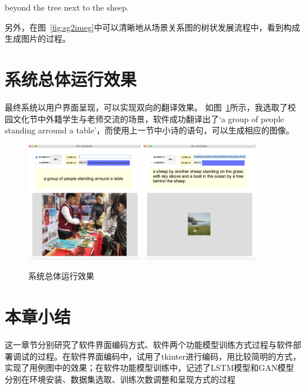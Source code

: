 beyond the tree next to the sheep.

另外，在图~\ref{fig:sg2imeg}中可以清晰地从场景关系图的树状发展流程中，看到构成生成图片的过程。

\section{系统总体运行效果}
最终系统以用户界面呈现，可以实现双向的翻译效果。
如图~\ref{fig:eff}所示，我选取了校园文化节中外籍学生与老师交流的场景，软件成功翻译出了‘a group of people standing arround a table’，而使用上一节中小诗的语句，可以生成相应的图像。

\begin{figure}[!htbp]
    \centering
        \includegraphics[width=0.45\textwidth]{figures/img2txt.png}
        \includegraphics[width=0.45\textwidth]{figures/txt2img.png}
    \caption{系统总体运行效果}
    \label{fig:eff}
\end{figure}

\section{本章小结}
这一章节分别研究了软件界面编码方式、软件两个功能模型训练方式过程与软件部署调试的过程。在软件界面编码中，试用了tkinter进行编码，用比较简明的方式，实现了用例图中的效果；在软件功能模型训练中，记述了LSTM模型和GAN模型分别在环境安装、数据集选取、训练次数调整和呈现方式的过程




